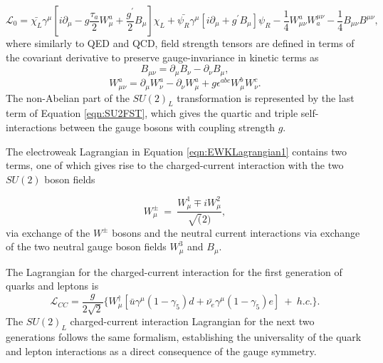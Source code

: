 \begin{equation}
\mathcal{L}_{0} = \bar{\chi_{L}}\gamma^{\mu} [i\partial_{\mu} - g \frac{\tau_{a}}{2} W^a_{\mu} + \frac{g^{'}}{2} B_{\mu} ] \chi_{L} + \bar{\psi_{R}} \gamma^{\mu} [ i \partial_{\mu} + g^{'} B_{\mu} ] \psi_{R} - \frac{1}{4} W_{\mu\nu}^{a} W^{\mu\nu}_{a} - \frac{1}{4} B_{\mu\nu} B^{\mu\nu},
\label{eqn:EWKLagrangian1}
\end{equation}
where similarly to QED and QCD, field strength tensors are defined in terms of the covariant derivative to preserve gauge-invariance in kinetic terms as
\begin{equation}
B_{\mu\nu} = \partial_{\mu}B_{\nu} - \partial_{\nu}B_{\mu},
\label{eqn:U1YFST}
\end{equation}
\begin{equation}
W_{\mu\nu}^{a} = \partial_{\mu}W_{\nu}^{a} - \partial_{\nu}W_{\mu}^{a} + g\epsilon^{abc}W_{\mu}^{b}W_{\nu}^{c}.
\label{eqn:SU2FST}
\end{equation}
The non-Abelian part of the $SU(2)_{L}$ transformation is represented by the last term of Equation \ref{eqn:SU2FST}, which gives the quartic and triple self-interactions between the gauge bosons with coupling strength $g$. 

The electroweak Lagrangian in Equation \ref{eqn:EWKLagrangian1} contains two terms, one of which gives rise to the charged-current interaction with the two $SU(2)$ boson fields 

\begin{equation}
W^{\pm}_{\mu} ~=~ \frac{ W^{1}_{\mu} \mp iW^{2}_{\mu} } {\sqrt(2)},
\label{eqn:RealWBosons}
\end{equation}
via exchange of the $W^{\pm}$ bosons and the neutral current interactions via exchange of the two neutral gauge boson fields $W^{3}_{\mu}$ and $B_{\mu}$. 

The Lagrangian for the charged-current interaction for the first generation of quarks and leptons is 
\begin{equation}
\mathcal{L}_{CC} = \frac{g}{2\sqrt{2}} \{ W^{\dagger}_{\mu} [\bar{u}\gamma^{\mu}(1-\gamma_{5})d + \bar{\nu_{e}}\gamma^{\mu}(1-\gamma_{5})e ]~+~h.c. \}.
\label{eqn:SU2CCLag}
\end{equation}
The $SU(2)_{L}$ charged-current interaction Lagrangian for the next two generations follows the same formalism, establishing the universality of the quark and lepton interactions as a direct consequence of the gauge symmetry.

